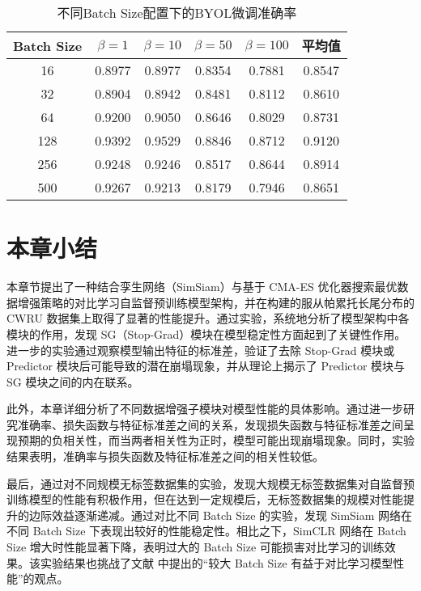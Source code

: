 \documentclass[master]{thesis-uestc}
\begin{document}
\begin{table}[h]
    \centering
    \caption{不同Batch Size配置下的BYOL微调准确率}
    \begin{tabular}{cccccc}
    \hline
    \textbf{Batch Size} & \textbf{$\beta = 1$} & \textbf{$\beta = 10$} & \textbf{$\beta = 50$} & \textbf{$\beta = 100$} & \textbf{平均值} \\
    \hline
    16   & 0.8977 & 0.8977 & 0.8354 & 0.7881 & 0.8547 \\
    32   & 0.8904 & 0.8942 & 0.8481 & 0.8112 & 0.8610 \\
    64   & 0.9200 & 0.9050 & 0.8646 & 0.8029 & 0.8731 \\
    128  & 0.9392 & 0.9529 & 0.8846 & 0.8712 & 0.9120 \\
    256  & 0.9248 & 0.9246 & 0.8517 & 0.8644 & 0.8914 \\
    500  & 0.9267 & 0.9213 & 0.8179 & 0.7946 & 0.8651 \\
    \hline
    \end{tabular}
    \label{tab:batch_size_byol_finetune}
\end{table}

\section{本章小结}
本章节提出了一种结合孪生网络（SimSiam）与基于 CMA-ES 优化器搜索最优数据增强策略的对比学习自监督预训练模型架构，并在构建的服从帕累托长尾分布的 CWRU 数据集上取得了显著的性能提升。通过实验，系统地分析了模型架构中各模块的作用，发现 SG（Stop-Grad）模块在模型稳定性方面起到了关键性作用。进一步的实验通过观察模型输出特征的标准差，验证了去除 Stop-Grad 模块或 Predictor 模块后可能导致的潜在崩塌现象，并从理论上揭示了 Predictor 模块与 SG 模块之间的内在联系。

此外，本章详细分析了不同数据增强子模块对模型性能的具体影响。通过进一步研究准确率、损失函数与特征标准差之间的关系，发现损失函数与特征标准差之间呈现预期的负相关性，而当两者相关性为正时，模型可能出现崩塌现象。同时，实验结果表明，准确率与损失函数及特征标准差之间的相关性较低。

最后，通过对不同规模无标签数据集的实验，发现大规模无标签数据集对自监督预训练模型的性能有积极作用，但在达到一定规模后，无标签数据集的规模对性能提升的边际效益逐渐递减。通过对比不同 Batch Size 的实验，发现 SimSiam 网络在不同 Batch Size 下表现出较好的性能稳定性。相比之下，SimCLR 网络在 Batch Size 增大时性能显著下降，表明过大的 Batch Size 可能损害对比学习的训练效果。该实验结果也挑战了文献 \cite{chen2020simple} 中提出的“较大 Batch Size 有益于对比学习模型性能”的观点。
\end{document}
